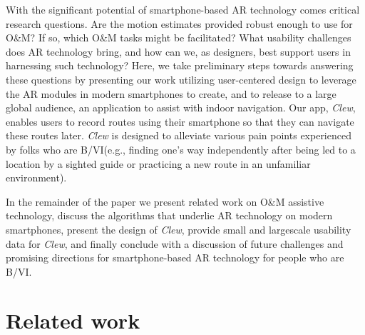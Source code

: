 \documentclass[chi_draft]{sigchi}
\newcommand{\BVI}{B/VI\xspace}
\newcommand{\OM}{O\&M\xspace}
\begin{document}
With the significant potential of smartphone-based AR technology comes critical research questions.  Are the motion estimates provided robust enough to use for \OM? If so, which \OM tasks might be facilitated?  What usability challenges does AR technology bring, and how can we, as designers, best support users in harnessing such technology?  Here, we take preliminary steps towards answering these questions by presenting our work utilizing user-centered design to leverage the AR modules in modern smartphones to create, and to release to a large global audience, an application to assist with indoor navigation.  Our app, \emph{Clew}, enables users to record routes using their smartphone so that they can navigate these routes later.  \emph{Clew} is designed to alleviate various pain points experienced by folks who are \BVI (e.g., finding one's way independently after being led to a location by a sighted guide or practicing a new route in an unfamiliar environment).%

In the remainder of the paper we present related work on \OM assistive technology, discuss the algorithms that underlie AR technology on modern smartphones, present the design of \emph{Clew}, provide small and largescale usability data for \emph{Clew}, and finally conclude with a discussion of future challenges and promising directions for smartphone-based AR technology for people who are \BVI.

\section{Related work}
\end{document}
